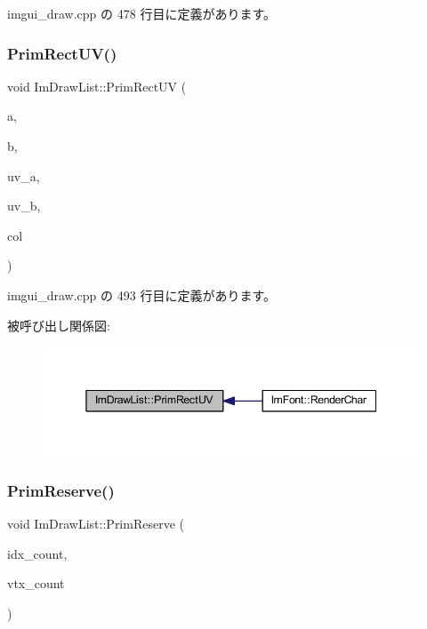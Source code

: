  imgui\+\_\+draw.\+cpp の 478 行目に定義があります。

\mbox{\label{struct_im_draw_list_a77d48ed5b33ccdd908824c0a3bebfff8}} 
\subsubsection{\texorpdfstring{Prim\+Rect\+U\+V()}{PrimRectUV()}}
{\footnotesize\ttfamily void Im\+Draw\+List\+::\+Prim\+Rect\+UV (\begin{DoxyParamCaption}\item[{const \mbox{\hyperlink{struct_im_vec2}{Im\+Vec2}} \&}]{a,  }\item[{const \mbox{\hyperlink{struct_im_vec2}{Im\+Vec2}} \&}]{b,  }\item[{const \mbox{\hyperlink{struct_im_vec2}{Im\+Vec2}} \&}]{uv\+\_\+a,  }\item[{const \mbox{\hyperlink{struct_im_vec2}{Im\+Vec2}} \&}]{uv\+\_\+b,  }\item[{\mbox{\hyperlink{imgui_8h_a118cff4eeb8d00e7d07ce3d6460eed36}{Im\+U32}}}]{col }\end{DoxyParamCaption})}



 imgui\+\_\+draw.\+cpp の 493 行目に定義があります。

被呼び出し関係図\+:\nopagebreak
\begin{figure}[H]
\begin{center}
\leavevmode
\includegraphics[width=345pt]{struct_im_draw_list_a77d48ed5b33ccdd908824c0a3bebfff8_icgraph}
\end{center}
\end{figure}
\mbox{\label{struct_im_draw_list_a879aa38dbfb0344e3e023d65c002c7d7}} 
\subsubsection{\texorpdfstring{Prim\+Reserve()}{PrimReserve()}}
{\footnotesize\ttfamily void Im\+Draw\+List\+::\+Prim\+Reserve (\begin{DoxyParamCaption}\item[{int}]{idx\+\_\+count,  }\item[{int}]{vtx\+\_\+count }\end{DoxyParamCaption})}



